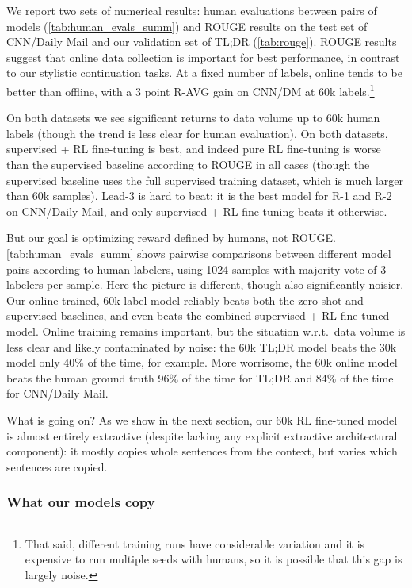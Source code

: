We report two sets of numerical results: human evaluations between pairs of models (\ref{tab:human_evals_summ}) and ROUGE results on the test set of CNN/Daily Mail and our validation set of TL;DR (\ref{tab:rouge}).  ROUGE results suggest that online data collection is important for best performance, in contrast to our stylistic continuation tasks.  At a fixed number of labels, online tends to be better than offline, with a 3 point R-AVG gain on CNN/DM at 60k labels.\footnote{That said, different training runs have considerable variation and it is expensive to run multiple seeds with humans, so it is possible that this gap is largely noise.}

On both datasets we see significant returns to data volume up to 60k human labels (though the trend is less clear for human evaluation).  On both datasets, supervised + RL fine-tuning is best, and indeed pure RL fine-tuning is worse than the supervised baseline according to ROUGE in all cases (though the supervised baseline uses the full supervised training dataset, which is much larger than 60k samples).  Lead-3 is hard to beat: it is the best model for R-1 and R-2 on CNN/Daily Mail, and only supervised + RL fine-tuning beats it otherwise.

But our goal is optimizing reward defined by humans, not ROUGE.
\ref{tab:human_evals_summ} shows pairwise comparisons between different model pairs according to human labelers, using 1024 samples with majority vote of 3 labelers per sample. Here the picture is different, though also significantly noisier. Our online trained, 60k label model reliably beats both the zero-shot and supervised baselines, and even beats the combined supervised + RL fine-tuned model.  Online training remains important, but the situation w.r.t.\ data volume is less clear and likely contaminated by noise: the 60k TL;DR model beats the 30k model only 40\% of the time, for example.  More worrisome, the 60k online model beats the human ground truth 96\% of the time for TL;DR and 84\% of the time for CNN/Daily Mail.

What is going on?  As we show in the next section, our 60k RL fine-tuned model is almost entirely extractive (despite lacking any explicit extractive architectural component): it mostly copies whole sentences from the context, but varies which sentences are copied.

\subsubsection{What our models copy \label{sec:copiers}}

